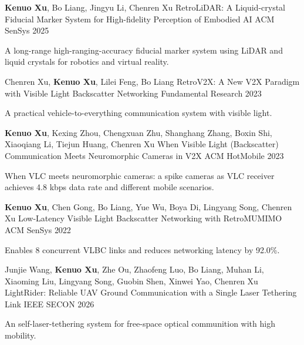 \documentclass[11pt, a4paper]{awesome-cv}
\begin{document}
\begin{cventries}
	
	\cventry
	{\textbf{Kenuo Xu}, Bo Liang, Jingyu Li, Chenren Xu}
	{RetroLiDAR: A Liquid-crystal Fiducial Marker System for High-fidelity Perception of Embodied AI}
	{ACM SenSys}
	{2025}
	{
		\begin{cvitems} %
			\item {A long-range high-ranging-accuracy fiducial marker system using LiDAR and liquid crystals for robotics and virtual reality.}
		\end{cvitems}
	}
		
	\cventry
	{Chenren Xu, \textbf{Kenuo Xu}, Lilei Feng, Bo Liang}
	{RetroV2X: A New V2X Paradigm with Visible Light Backscatter Networking}
	{Fundamental Research}
	{2023}
	{
		\begin{cvitems} %
			\item {A practical vehicle-to-everything communication system with visible light.}
		\end{cvitems}
	}
	
	\cventry
	{\textbf{Kenuo Xu}, Kexing Zhou, Chengxuan Zhu, Shanghang Zhang, Boxin Shi, Xiaoqiang Li, Tiejun Huang, Chenren Xu}
	{When Visible Light (Backscatter) Communication Meets Neuromorphic Cameras in V2X}
	{ACM HotMobile}
	{2023}
	{
		\begin{cvitems} %
			\item {When VLC meets neuromorphic cameras: a spike cameras as VLC receiver achieves 4.8 kbps data rate and different mobile scenarios.}
		\end{cvitems}
	}
		
	\cventry
	{\textbf{Kenuo Xu}, Chen Gong, Bo Liang, Yue Wu, Boya Di, Lingyang Song, Chenren Xu}
	{Low-Latency Visible Light Backscatter Networking with RetroMUMIMO}
	{ACM SenSys}
	{2022}
	{
		\begin{cvitems} %
			\item {Enables 8 concurrent VLBC links and reduces networking latency by 92.0\%.}
		\end{cvitems}
	}
		
	\cventry
	{Junjie Wang, \textbf{Kenuo Xu}, Zhe Ou, Zhaofeng Luo, Bo Liang, Muhan Li, Xiaoming Liu, Lingyang Song, Guobin Shen, Xinwei Yao, Chenren Xu}
	{LightRider: Reliable UAV Ground Communication with a Single Laser Tethering Link}
	{IEEE SECON}
	{2026}
	{
		\begin{cvitems} %
			\item {An self-laser-tethering system for free-space optical communition with high mobility.}
		\end{cvitems}
	}
		

\end{cventries}
\end{document}
